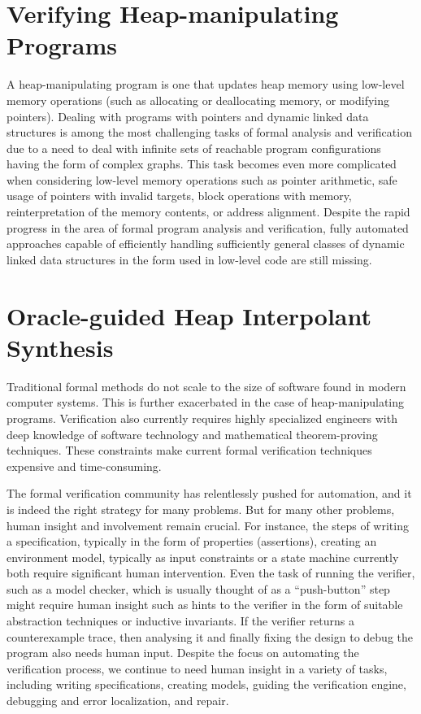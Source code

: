 \section{Verifying Heap-manipulating Programs}
A heap-manipulating program is one that updates heap memory using low-level memory
operations (such as allocating or deallocating memory, or modifying pointers). Dealing
with programs with pointers and dynamic linked data structures is among the most
challenging tasks of formal analysis and verification due to a need to deal with infinite
sets of reachable program configurations having the form of complex graphs. This task
becomes even more complicated when considering low-level memory operations such as
pointer arithmetic, safe usage of pointers with invalid targets, block operations with
memory, reinterpretation of the memory contents, or address alignment. Despite the rapid
progress in the area of formal program analysis and verification, fully automated
approaches capable of efficiently handling sufficiently general classes of dynamic
linked data structures in the form used in low-level code are still missing.

\section{Oracle-guided Heap Interpolant Synthesis}
Traditional formal methods do not scale to the size of software found in modern computer
systems. This is further exacerbated in the case of heap-manipulating programs.
Verification also currently requires highly specialized engineers with deep knowledge of
software technology and mathematical theorem-proving techniques. These constraints make
current formal verification techniques expensive and time-consuming.

The formal verification community has relentlessly pushed for automation, and it is
indeed the right strategy for many problems. But for many other problems, human insight
and involvement remain crucial. For instance, the steps of writing a specification,
typically in the form of properties (assertions), creating an environment model,
typically as input constraints or a state machine currently both require significant
human intervention. Even the task of running the verifier, such as a model checker, which
is usually thought of as a ``push-button'' step might require human insight such as hints
to the verifier in the form of suitable abstraction techniques or inductive invariants.
If the verifier returns a counterexample trace, then analysing it and finally fixing the
design to debug the program also needs human input. Despite the focus on automating the
verification process, we continue to need human insight in a variety of tasks, including
writing specifications, creating models, guiding the verification engine, debugging and
error localization, and repair.

